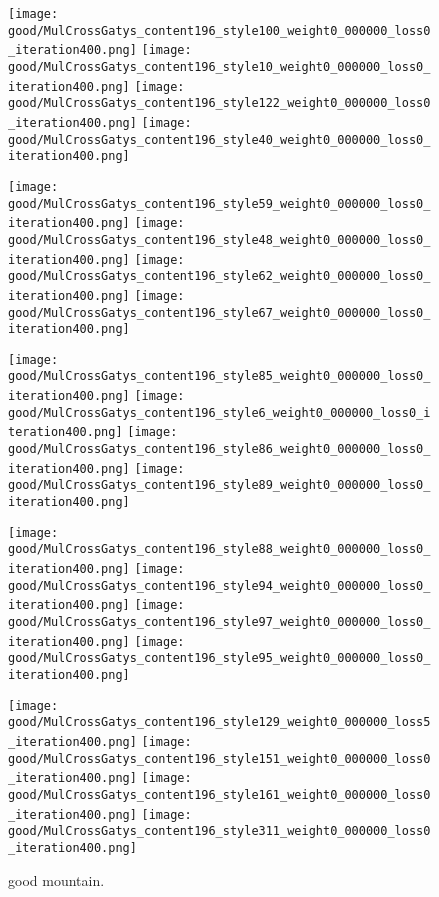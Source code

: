   \begin{figure*}[!htbp]
  \centering
  \small 
  \texttt{[image: good/MulCrossGatys\_content196\_style100\_weight0\_000000\_loss0\_iteration400.png]}
      \texttt{[image: good/MulCrossGatys\_content196\_style10\_weight0\_000000\_loss0\_iteration400.png]}
      \texttt{[image: good/MulCrossGatys\_content196\_style122\_weight0\_000000\_loss0\_iteration400.png]}
      \texttt{[image: good/MulCrossGatys\_content196\_style40\_weight0\_000000\_loss0\_iteration400.png]}
      
      \texttt{[image: good/MulCrossGatys\_content196\_style59\_weight0\_000000\_loss0\_iteration400.png]}
      \texttt{[image: good/MulCrossGatys\_content196\_style48\_weight0\_000000\_loss0\_iteration400.png]}
      \texttt{[image: good/MulCrossGatys\_content196\_style62\_weight0\_000000\_loss0\_iteration400.png]}
      \texttt{[image: good/MulCrossGatys\_content196\_style67\_weight0\_000000\_loss0\_iteration400.png]}
      
      \texttt{[image: good/MulCrossGatys\_content196\_style85\_weight0\_000000\_loss0\_iteration400.png]}
      \texttt{[image: good/MulCrossGatys\_content196\_style6\_weight0\_000000\_loss0\_iteration400.png]}
      \texttt{[image: good/MulCrossGatys\_content196\_style86\_weight0\_000000\_loss0\_iteration400.png]}
      \texttt{[image: good/MulCrossGatys\_content196\_style89\_weight0\_000000\_loss0\_iteration400.png]}
      
          \texttt{[image: good/MulCrossGatys\_content196\_style88\_weight0\_000000\_loss0\_iteration400.png]}
      \texttt{[image: good/MulCrossGatys\_content196\_style94\_weight0\_000000\_loss0\_iteration400.png]}
      \texttt{[image: good/MulCrossGatys\_content196\_style97\_weight0\_000000\_loss0\_iteration400.png]}
      \texttt{[image: good/MulCrossGatys\_content196\_style95\_weight0\_000000\_loss0\_iteration400.png]}
      
      \texttt{[image: good/MulCrossGatys\_content196\_style129\_weight0\_000000\_loss5\_iteration400.png]}
      \texttt{[image: good/MulCrossGatys\_content196\_style151\_weight0\_000000\_loss0\_iteration400.png]}
      \texttt{[image: good/MulCrossGatys\_content196\_style161\_weight0\_000000\_loss0\_iteration400.png]}
      \texttt{[image: good/MulCrossGatys\_content196\_style311\_weight0\_000000\_loss0\_iteration400.png]}
  \caption{good mountain.  }
  \label{fig:good1}
  \end{figure*}
  